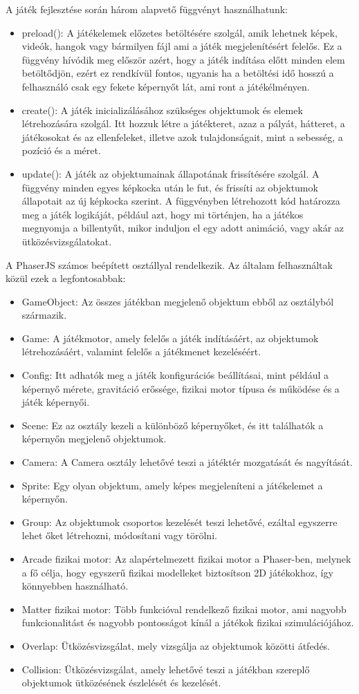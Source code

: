 \documentclass[12pt, a4paper]{report}
\theoremstyle{definition}
\begin{document}
	A játék fejlesztése során három alapvető függvényt használhatunk:
		\begin{itemize}
		\item preload(): A játékelemek előzetes betöltésére szolgál, amik lehetnek képek, videók, hangok vagy bármilyen fájl ami a játék megjelenítésért felelős. Ez a függvény hívódik meg először azért, hogy a játék indítása előtt minden elem betöltődjön, ezért ez rendkívül fontos, ugyanis ha a betöltési idő hosszú a felhasználó csak egy fekete képernyőt lát, ami ront a játékélményen.
		\item create(): A játék inicializálásához szükséges objektumok és elemek létrehozására szolgál. Itt hozzuk létre a játékteret, azaz a pályát, hátteret, a játékosokat és az ellenfeleket, illetve azok tulajdonságait, mint a sebesség, a pozíció és a méret.
		\item update(): A játék az objektumainak állapotának frissítésére szolgál. A függvény minden egyes képkocka után le fut, és frissíti az objektumok állapotait az új képkocka szerint. A függvényben létrehozott kód határozza meg a játék logikáját, például azt, hogy mi történjen, ha a játékos megnyomja a billentyűt, mikor induljon el egy adott animáció, vagy akár az ütközésvizsgálatokat.
	\end{itemize}
	A PhaserJS számos beépített osztállyal rendelkezik. Az általam felhasználtak közül ezek a legfontosabbak:
	\begin{itemize}
	\item GameObject: Az összes játékban megjelenő objektum ebből az osztályból származik.
	\item Game: A játékmotor, amely felelős a játék indításáért, az objektumok létrehozásáért, valamint felelős a játékmenet kezeléséért.
	\item Config: Itt adhatók meg a játék konfigurációs beállításai, mint például a képernyő mérete, gravitáció erőssége, fizikai motor típusa és működése és a játék képernyői.
	\item Scene: Ez az osztály kezeli a különböző képernyőket, és itt találhatók a képernyőn megjelenő objektumok.
	\item Camera: A Camera osztály lehetővé teszi a játéktér mozgatását és nagyítását.
	\item Sprite: Egy olyan objektum, amely képes megjeleníteni a játékelemet a képernyőn.
	\item Group: Az objektumok csoportos kezelését teszi lehetővé, ezáltal egyszerre lehet őket létrehozni, módosítani vagy törölni.
	\item Arcade fizikai motor: Az alapértelmezett fizikai motor a Phaser-ben, melynek a fő célja, hogy egyszerű fizikai modelleket biztosítson 2D játékokhoz, így könnyebben használható.
	\item Matter fizikai motor: Több funkcióval rendelkező fizikai motor, ami nagyobb funkcionalitást és nagyobb pontosságot kínál a játékok fizikai szimulációjához.
	\item Overlap: Ütközésvizsgálat, mely vizsgálja az objektumok közötti átfedés.
	\item Collision: Ütközésvizsgálat, amely lehetővé teszi a játékban szereplő objektumok ütközésének észlelését és kezelését.
	\end{itemize}
	
\end{document}
